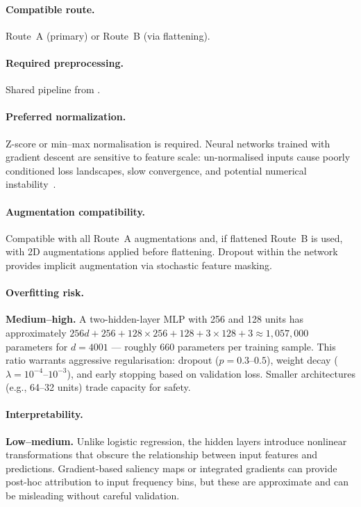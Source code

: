 \paragraph{Compatible route.}
Route~A (primary) or Route~B (via flattening).

\paragraph{Required preprocessing.}
Shared pipeline from .

\paragraph{Preferred normalization.}
Z-score or min--max normalisation is required.  Neural networks
trained with gradient descent are sensitive to feature scale:
un-normalised inputs cause poorly conditioned loss landscapes, slow
convergence, and potential numerical instability~\cite{goodfellow2016deep}.

\paragraph{Augmentation compatibility.}
Compatible with all Route~A augmentations and, if flattened Route~B
is used, with 2D augmentations applied before flattening.  Dropout
within the network provides implicit augmentation via stochastic
feature masking.

\paragraph{Overfitting risk.}
\textbf{Medium--high.}  A two-hidden-layer MLP with 256 and 128 units
has approximately $256d + 256 + 128 \times 256 + 128 + 3 \times 128 +
3 \approx 1{,}057{,}000$ parameters for $d = 4001$ --- roughly 660
parameters per training sample.  This ratio warrants aggressive
regularisation: dropout ($p = 0.3$--$0.5$), weight decay
($\lambda = 10^{-4}$--$10^{-3}$), and early stopping based on
validation loss.  Smaller architectures (e.g., 64--32 units) trade
capacity for safety.

\paragraph{Interpretability.}
\textbf{Low--medium.}  Unlike logistic regression, the hidden layers
introduce nonlinear transformations that obscure the relationship
between input features and predictions.  Gradient-based saliency maps
or integrated gradients can provide post-hoc attribution to input
frequency bins, but these are approximate and can be misleading
without careful validation.

